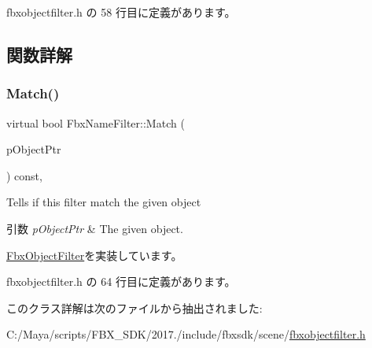  fbxobjectfilter.\+h の 58 行目に定義があります。



\subsection{関数詳解}
\mbox{\label{class_fbx_name_filter_a2767c75f626baed7800308f937302743}} 
\subsubsection{\texorpdfstring{Match()}{Match()}}
{\footnotesize\ttfamily virtual bool Fbx\+Name\+Filter\+::\+Match (\begin{DoxyParamCaption}\item[{const \hyperlink{class_fbx_object}{Fbx\+Object} $\ast$}]{p\+Object\+Ptr }\end{DoxyParamCaption}) const\hspace{0.3cm}{\ttfamily [inline]}, {\ttfamily [virtual]}}

Tells if this filter match the given object 
\begin{DoxyParams}{引数}
{\em p\+Object\+Ptr} & The given object. \\
\hline
\end{DoxyParams}


\hyperlink{class_fbx_object_filter_a49cc7b7c109f98910241d62ec0bd093b}{Fbx\+Object\+Filter}を実装しています。



 fbxobjectfilter.\+h の 64 行目に定義があります。



このクラス詳解は次のファイルから抽出されました\+:\begin{DoxyCompactItemize}
\item 
C\+:/\+Maya/scripts/\+F\+B\+X\+\_\+\+S\+D\+K/2017./include/fbxsdk/scene/\hyperlink{fbxobjectfilter_8h}{fbxobjectfilter.\+h}\end{DoxyCompactItemize}
